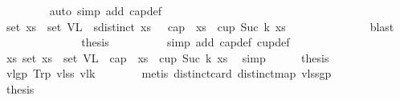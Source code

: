 \begin{isabellebody}
\begin{isamarkuptext}
\end{isamarkuptext}\isamarkuptrue%
\ \ \ \ \ \ \ \ \isamarkupfalse%
{\isacharparenleft}{\kern0pt}auto\ simp\ add{\isacharcolon}{\kern0pt}\ cap{\isacharunderscore}{\kern0pt}def{\isacharparenright}{\kern0pt}\ \isanewline
\ \ \ \ \ \ \ \ \isamarkupfalse%
\ {\isachardoublequoteopen}set\ xs\ {\isasymsubseteq}\ set\ V{}L\ {\isasymand}\ sdistinct\ xs\ {\isasymlongrightarrow}\ {\isasymnot}\ {\isacharparenleft}{\kern0pt}cap\ {}\ xs\ {\isasymor}\ cup\ {\isacharparenleft}{\kern0pt}Suc\ k{\isacharparenright}{\kern0pt}\ xs{\isacharparenright}{\kern0pt}{\isachardoublequoteclose}\ \isamarkupfalse%
\ {}\isanewline
\ \ \ \ \ \ \ \ \ \ \isamarkupfalse%
\ blast\isanewline
\ \ \ \ \ \ \isakeywordONE{{\isacharbraceright}{\kern0pt}}\isamarkupfalse%
\isanewline
\ \ \ \ \ \ \isamarkupfalse%
\ {\isacharquery}{\kern0pt}thesis\isanewline
\ \ \ \ \ \ \ \ \isamarkupfalse%
\ {\isacharparenleft}{\kern0pt}simp\ add{\isacharcolon}{\kern0pt}\ cap{\isacharunderscore}{\kern0pt}def\ cup{\isacharunderscore}{\kern0pt}def{\isacharparenright}{\kern0pt}\isanewline
\ \ \ \ \isamarkupfalse%
\isanewline
\ \ \ \ \isamarkupfalse%
\ {\isachardoublequoteopen}{\isacharparenleft}{\kern0pt}{\isasymforall}xs{\isachardot}{\kern0pt}\ {\isacharparenleft}{\kern0pt}set\ xs\ {\isasymsubseteq}\ set\ V{}L{\isacharparenright}{\kern0pt}\ {\isasymlongrightarrow}\ {\isasymnot}{\isacharparenleft}{\kern0pt}cap\ {}\ xs\ {\isasymor}\ cup\ {\isacharparenleft}{\kern0pt}Suc\ k{\isacharparenright}{\kern0pt}\ xs{\isacharparenright}{\kern0pt}{\isacharparenright}{\kern0pt}{\isachardoublequoteclose}\ \isamarkupfalse%
\ simp\isanewline
\ \ \ \ \isamarkupfalse%
\ {\isacharquery}{\kern0pt}thesis\ \isamarkupfalse%
\ v{}l{\isacharunderscore}{\kern0pt}gp\ Trp{\isacharparenleft}{\kern0pt}{}{\isacharparenright}{\kern0pt}\ v{}l{\isacharunderscore}{\kern0pt}ss\ v{}l{\isacharunderscore}{\kern0pt}k\isanewline
\ \ \ \ \ \ \isamarkupfalse%
\ {\isacharparenleft}{\kern0pt}metis\ distinct{\isacharunderscore}{\kern0pt}card\ distinct{\isacharunderscore}{\kern0pt}map\ v{}l{\isacharunderscore}{\kern0pt}ssgp{\isacharparenright}{\kern0pt}\isanewline
\ \ \ \ \isamarkupfalse%
\isanewline
\ \ \isamarkupfalse%
\ {\isacharquery}{\kern0pt}thesis\ \isamarkupfalse%

\end{isabellebody}
